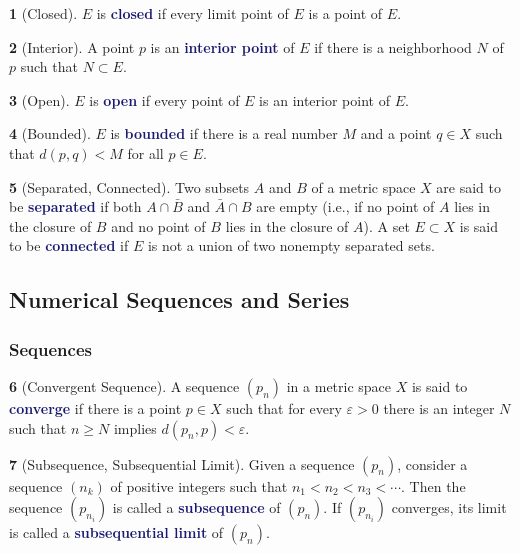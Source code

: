 \documentclass[11pt]{article}
\numberwithin{equation}{section}
\newcommand{\navy}[1]{\textcolor{MidnightBlue}{\bf #1}}
\theoremstyle{plain}
\theoremstyle{definition}
\newtheorem{definition}{\color{MidnightBlue}{\textbf{Definition}}}[section]
\newcommand{\1}{\mathbbm 1}
\newcommand{\e}{\varepsilon}
\begin{document}
\begin{definition}[Closed]
	$E$ is \navy{closed} if every limit point of $E$ is a point of $E$.
\end{definition}

\begin{definition}[Interior]
	A point $p$ is an \navy{interior point} of $E$ if there is a neighborhood $N$ of $p$ such that $N \subset E$.
\end{definition}

\begin{definition}[Open]
	$E$ is \navy{open} if every point of $E$ is an interior point of $E$.
\end{definition}

\begin{definition}[Bounded]
	$E$ is \navy{bounded} if there is a real number $M$ and a point $q \in X$ such that $d(p,q) < M$ for all $p \in E$.
\end{definition}

\begin{definition}[Separated, Connected]
	Two subsets $A$ and $B$ of a metric space $X$ are said to be \navy{separated} if both $A \cap \bar{B}$ and $\bar{A} \cap B$ are empty (i.e., if no point of $A$ lies in the closure of $B$ and no point of $B$ lies in the closure of $A$). A set $E \subset X$ is said to be \navy{connected} if $E$ is not a union of two nonempty separated sets. 
\end{definition}

\subsection{Numerical Sequences and Series}

\subsubsection{Sequences}

\begin{definition}[Convergent Sequence]
	A sequence $(p_n)$ in a metric space $X$ is said to \navy{converge} if there is a point $p \in X$ such that for every $\e > 0$ there is an integer $N$ such that $n \geq N$ implies $d(p_n,p) < \e$. 
\end{definition}

\begin{definition}[Subsequence, Subsequential Limit]
	Given a sequence $(p_n)$, consider a sequence $(n_k)$ of positive integers such that $n_1 < n_2 < n_3 < \cdots $. Then the sequence $(p_{n_i})$ is called a \navy{subsequence} of $(p_n)$. If $(p_{n_i})$ converges, its limit is called a \navy{subsequential limit} of $(p_n)$.
\end{definition}
\end{document}
